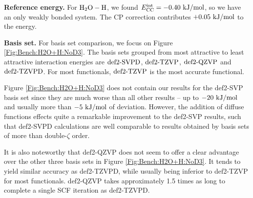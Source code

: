 \documentclass[8.5pt,twoside,twocolumn]{article}
\newcommand\kmo{\enmat{\te {kJ/mol}}}
\theoremstyle{standard}
\begin{document}
\textbf{Reference energy.} For $\mbox{\ensuremath{\text H _2 \text O-\text H}}$, we found \mbox{$\ecc=-0.40\ \kmo$}, so
we have an only weakly bonded system. The CP correction contributes $+0.05\ \kmo$ to
the energy.

\textbf{Basis set.} For basis set comparison, we focus on Figure
\ref{Fig:Bench:H2O+H:NoD3}. The basis sets grouped from most attractive to
least attractive interaction energies are $\text{def2-SVPD}$, $\text{def2-TZVP}$, $\text{def2-QZVP}$ and
$\text{def2-TZVPD}$.
For most functionals, $\text{def2-TZVP}$ is the most accurate functional.

Figure \ref{Fig:Bench:H2O+H:NoD3} does not contain our results for the def2-SVP basis
set since they are much worse than all other results -- up to $-20\ \kmo$ and
usually more than $-5\ \kmo$ of deviation. However, the addition of diffuse
functions effects quite a remarkable improvement to the def2-SVP results, such
that def2-SVPD calculations are well comparable to results obtained by basis
sets of more than double-$\zeta$ order.

It is also noteworthy that def2-QZVP does not seem to offer a clear advantage over the
other three basis sets in Figure \ref{Fig:Bench:H2O+H:NoD3}. It tends to yield
similar accuracy as def2-TZVPD, while usually being inferior to def2-TZVP for
most functionals. def2-QZVP takes approximately 1.5 times as long to complete a single
SCF iteration as def2-TZVPD. 
\end{document}
